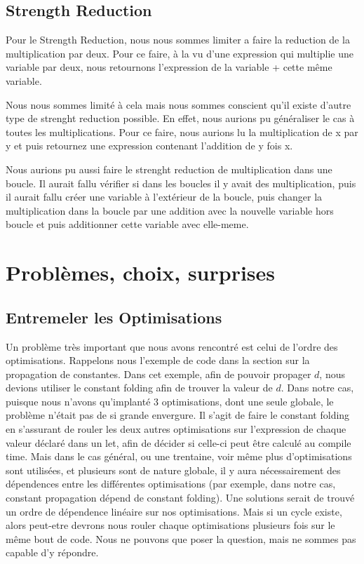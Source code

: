 \documentclass{article}
\begin{document}
\subsection{Strength Reduction}

Pour le Strength Reduction, nous nous sommes limiter a faire la reduction de la multiplication par deux. Pour ce faire, à la vu d'une expression qui multiplie une variable par deux, nous retournons l'expression de la variable + cette même variable. 

Nous nous sommes limité à cela mais nous sommes conscient qu'il existe d'autre type de strenght reduction possible. En effet, nous aurions pu généraliser le cas à toutes les multiplications. Pour ce faire, nous aurions lu la multiplication de x par y et puis retournez une expression contenant l'addition de y fois x. 

Nous aurions pu aussi faire le strenght reduction de multiplication dans une boucle. Il aurait fallu vérifier si dans les boucles il y avait des multiplication, puis il aurait fallu créer une variable à l'extérieur de la boucle, puis changer la multiplication dans la boucle par une addition avec la nouvelle variable hors boucle et puis additionner cette variable avec elle-meme. 

\section{Problèmes, choix, surprises}
\subsection{Entremeler les Optimisations}

Un problème très important que nous avons rencontré est celui de l'ordre des optimisations. Rappelons nous l'exemple de code dans la section sur la propagation de constantes. Dans cet exemple, afin de pouvoir propager $d$, nous devions utiliser le constant folding afin de trouver la valeur de $d$. Dans notre cas, puisque nous n'avons qu'implanté 3 optimisations, dont une seule globale, le problème n'était pas de si grande envergure. Il s'agit de faire le constant folding en s'assurant de rouler les deux autres optimisations sur l'expression de chaque valeur déclaré dans un let, afin de décider si celle-ci peut être calculé au compile time. Mais dans le cas général, ou une trentaine, voir même plus d'optimisations sont utilisées, et plusieurs sont de nature globale, il y aura nécessairement des dépendences entre les différentes optimisations (par exemple, dans notre cas, constant propagation dépend de constant folding). Une solutions serait de trouvé un ordre de dépendence linéaire sur nos optimisations. Mais si un cycle existe, alors peut-etre devrons nous rouler chaque optimisations plusieurs fois sur le même bout de code. Nous ne pouvons que poser la question, mais ne sommes pas capable d'y répondre.
\end{document}
